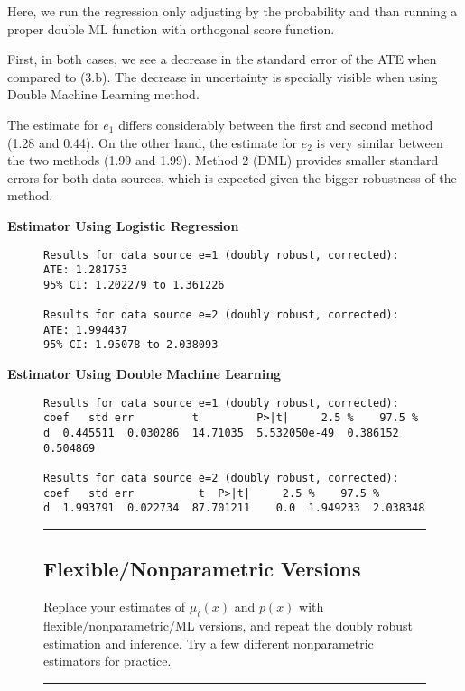 \documentclass{article}
\newenvironment{colorparagraph}[1]{\par\color{#1}}{\par}
\begin{document}
Here, we run the regression only adjusting by the probability and than running a proper double ML function with orthogonal score function.

First, in both cases, we see a decrease in the standard error of the ATE when compared to (3.b). The decrease in uncertainty is specially visible when using Double Machine Learning method.

The estimate for $e_1$ differs considerably between the first and second method (1.28 and 0.44). On the other hand, the estimate for $e_2$ is very similar between the two methods (1.99 and 1.99). Method 2 (DML) provides smaller standard errors for both data sources, which is expected given the bigger robustness of the method.

\textbf{Estimator Using Logistic Regression}

\begin{figure}[H]
  \begin{lstlisting}[style=RstyleComment, caption=Doubly Robust ATE Estimation]
Results for data source e=1 (doubly robust, corrected):
ATE: 1.281753 
95% CI: 1.202279 to 1.361226 

Results for data source e=2 (doubly robust, corrected):
ATE: 1.994437 
95% CI: 1.95078 to 2.038093 
  \end{lstlisting}
\end{figure}

\textbf{Estimator Using Double Machine Learning}

\begin{figure}[H]
\begin{lstlisting}[style=RstyleComment, caption=Doubly Robust ATE Estimation]
Results for data source e=1 (doubly robust, corrected):
coef   std err         t         P>|t|     2.5 %    97.5 %
d  0.445511  0.030286  14.71035  5.532050e-49  0.386152  0.504869

Results for data source e=2 (doubly robust, corrected):
coef   std err          t  P>|t|     2.5 %    97.5 %
d  1.993791  0.022734  87.701211    0.0  1.949233  2.038348
\end{lstlisting}
\end{figure}

\begin{figure}[H]
  \begin{colorparagraph}{questioncolor}
  \rule{\textwidth}{0.5pt}
  \label{q3d}
  \subsection{Flexible/Nonparametric Versions}

  Replace your estimates of \( \mu_t(x) \) and \( p(x) \) with flexible/nonparametric/ML versions, and repeat the doubly robust estimation and inference. Try a few different nonparametric estimators for practice.

  \rule{\textwidth}{0.5pt}
  \end{colorparagraph}
\end{figure}
\end{document}
